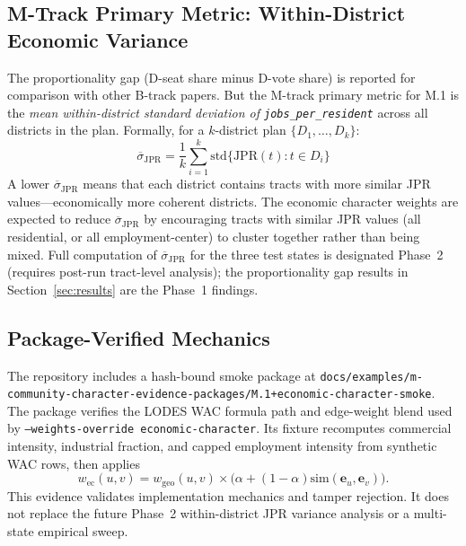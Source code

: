 \subsection{M-Track Primary Metric: Within-District Economic Variance}

The proportionality gap (D-seat share minus D-vote share) is reported for
comparison with other B-track papers.
But the M-track primary metric for M.1 is the \emph{mean within-district
standard deviation of \texttt{jobs\_per\_resident}} across all districts in the plan.
Formally, for a $k$-district plan $\{D_1, \ldots, D_k\}$:
\begin{equation}
  \overline{\sigma}_{\mathrm{JPR}}
  = \frac{1}{k} \sum_{i=1}^{k}
    \mathrm{std}\bigl\{\mathrm{JPR}(t) : t \in D_i\bigr\}
  \label{eq:within-var}
\end{equation}
A lower $\overline{\sigma}_{\mathrm{JPR}}$ means that each district contains
tracts with more similar JPR values---economically more coherent districts.
The economic character weights are expected to reduce $\overline{\sigma}_{\mathrm{JPR}}$
by encouraging tracts with similar JPR values (all residential, or all
employment-center) to cluster together rather than being mixed.
Full computation of $\overline{\sigma}_{\mathrm{JPR}}$ for the three test
states is designated Phase~2 (requires post-run tract-level analysis);
the proportionality gap results in Section~\ref{sec:results} are the Phase~1
findings.

\subsection{Package-Verified Mechanics}

The repository includes a hash-bound smoke package at
\texttt{docs/examples/m-community-character-evidence-packages/M.1+economic-character-smoke}.
The package verifies the LODES WAC formula path and edge-weight blend used by
\texttt{--weights-override economic-character}.  Its fixture recomputes
commercial intensity, industrial fraction, and capped employment intensity from
synthetic WAC rows, then applies
\[
  w_{\mathrm{ec}}(u,v)
  = w_{\mathrm{geo}}(u,v)
    \times \bigl(\alpha + (1-\alpha)\mathrm{sim}(\mathbf{e}_u,\mathbf{e}_v)\bigr).
\]
This evidence validates implementation mechanics and tamper rejection. It does
not replace the future Phase~2 within-district JPR variance analysis or a
multi-state empirical sweep.
